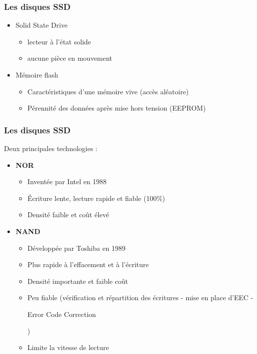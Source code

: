 \begin{frame}
\frametitle{Les disques SSD}
\begin{itemize}
\item Solid State Drive
\begin{itemize}
\item lecteur à l'état solide
\item aucune pièce en mouvement
\end{itemize}

\item Mémoire flash
\begin{itemize}
\item Caractéristiques d'une mémoire vive (accès aléatoire)
\item Pérennité des données après mise hors tension (EEPROM)
\end{itemize}
\end{itemize}
\end{frame}


\begin{frame}
\frametitle{Les disques SSD}
Deux principales technologies :
\begin{itemize}
\item \textbf{NOR}
\begin{itemize}
\item Inventée par Intel en 1988
\item Écriture lente, lecture rapide et fiable (100\%)
\item Densité faible et coût élevé
\end{itemize}
\item \textbf{NAND}
\begin{itemize}
\item Développée par Toshiba en 1989
\item Plus rapide à l'effacement et à l'écriture
\item Densité importante et faible coût
\item Peu fiable (vérification et répartition des écritures - mise en place d'EEC -\begin{tiny} Error Code Correction\end{tiny})
\item Limite la vitesse de lecture
\end{itemize}
\end{itemize}
\end{frame}

